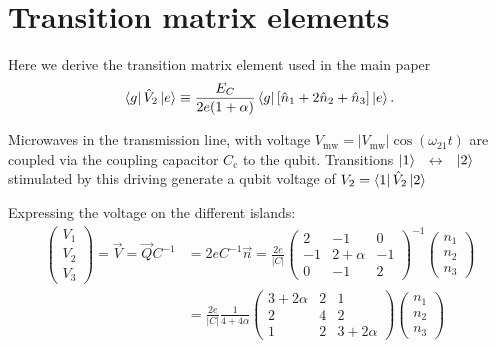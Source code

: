\documentclass[%
superscriptaddress,
preprint,
preprintnumbers,
bibnotes,
amsmath,
amssymb,
aps,
showkeys,
prb,
]{revtex4-1}
\newcommand{\iket}[1]{\ensuremath{\Ket{#1}}}
\newcommand{\ibra}[1]{\ensuremath{\Bra{#1}}}
\newcommand{\iketbra}[2]{\ket{#1}\bra{#2}}
\newcommand{\iabs}[1]{\ensuremath{\left|#1\right|}}
\newcommand{\ilra}{\ensuremath{\,\leftrightarrow\,}}
\begin{document}

\section{Transition matrix elements}
\label{sec:trans-matr-elem}

\begin{framed}\noindent
  Here we derive the transition matrix element used in the main paper
      \begin{equation}
    \label{eq:dipole_voltage_6}
    \ibra{g}\hat{V}_2 \iket{e} \equiv \frac{E_{C}}{2 e (1+\alpha)}\ibra{g}\left[\hat{n}_1  +  2\hat{n}_{2}
        +\hat{n}_3 \right]\iket{e}.
  \end{equation}
\end{framed}

Microwaves   in  the  transmission  line,   with  voltage
$   V_{\text{mw}}=   \iabs{V_{\text{mw}}}\cos(\omega_{21   }t)   $  are   coupled   via the coupling capacitor
$C_{\text{c}}$  to   the  qubit. Transitions \iket{1}~\ilra~\iket{2} stimulated by
this driving  generate a qubit voltage  of $  V_2 = \ibra{1}\hat{V}_2\iket{2} $

Expressing the voltage on the different islands:
  \begin{equation}
    \label{eq:dipole_voltage_8}
    \begin{aligned}
      \begin{pmatrix}
        V_{1}\\V_{2}\\V_{3}
      \end{pmatrix}  =  \vec{V}  =   \vec{Q}C^{-1}  &  =2eC^{-1}\vec{n}  =  \frac{2e}{\iabs{C}
      }\begin{pmatrix}
          2 & -1 & 0\\
          -1 & 2 + \alpha & -1\\
          0 & -1 & 2
        \end{pmatrix}^{-1} \begin{pmatrix} n_{1}\\n_{2}\\n_{3}
      \end{pmatrix}\\
      & = \frac{2e}{\iabs{C}} \frac{1}{4 + 4\alpha}\begin{pmatrix}
          3 + 2\alpha & 2 & 1\\
          2 & 4 & 2\\
          1 & 2 & 3+2\alpha
        \end{pmatrix} \begin{pmatrix} n_{1}\\n_{2}\\n_{3}
      \end{pmatrix}
          \end{aligned}
  \end{equation}
\end{document}
